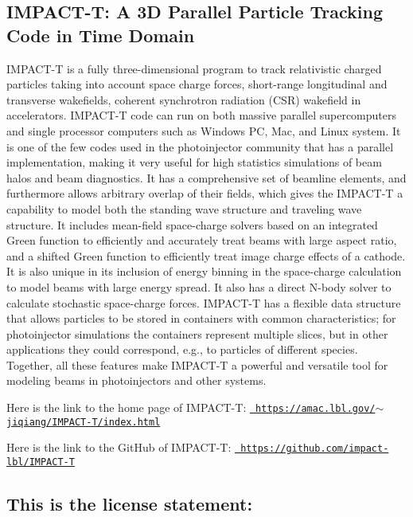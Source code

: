 \subsection*{I\+M\+P\+A\+C\+T-\/T\+: A 3D Parallel Particle Tracking Code in Time Domain }

I\+M\+P\+A\+C\+T-\/T is a fully three-\/dimensional program to track relativistic charged particles taking into account space charge forces, short-\/range longitudinal and transverse wakefields, coherent synchrotron radiation (C\+SR) wakefield in accelerators. I\+M\+P\+A\+C\+T-\/T code can run on both massive parallel supercomputers and single processor computers such as Windows PC, Mac, and Linux system. It is one of the few codes used in the photoinjector community that has a parallel implementation, making it very useful for high statistics simulations of beam halos and beam diagnostics. It has a comprehensive set of beamline elements, and furthermore allows arbitrary overlap of their fields, which gives the I\+M\+P\+A\+C\+T-\/T a capability to model both the standing wave structure and traveling wave structure. It includes mean-\/field space-\/charge solvers based on an integrated Green function to efficiently and accurately treat beams with large aspect ratio, and a shifted Green function to efficiently treat image charge effects of a cathode. It is also unique in its inclusion of energy binning in the space-\/charge calculation to model beams with large energy spread. It also has a direct N-\/body solver to calculate stochastic space-\/charge forces. I\+M\+P\+A\+C\+T-\/T has a flexible data structure that allows particles to be stored in containers with common characteristics; for photoinjector simulations the containers represent multiple slices, but in other applications they could correspond, e.\+g., to particles of different species. Together, all these features make I\+M\+P\+A\+C\+T-\/T a powerful and versatile tool for modeling beams in photoinjectors and other systems.

Here is the link to the home page of I\+M\+P\+A\+C\+T-\/T\+: \href{https://amac.lbl.gov/~jiqiang/IMPACT-T/index.html}{\texttt{ https\+://amac.\+lbl.\+gov/$\sim$jiqiang/\+I\+M\+P\+A\+C\+T-\/\+T/index.\+html}}

Here is the link to the Git\+Hub of I\+M\+P\+A\+C\+T-\/T\+: \href{https://github.com/impact-lbl/IMPACT-T}{\texttt{ https\+://github.\+com/impact-\/lbl/\+I\+M\+P\+A\+C\+T-\/T}}

\subsection*{This is the license statement\+: }

